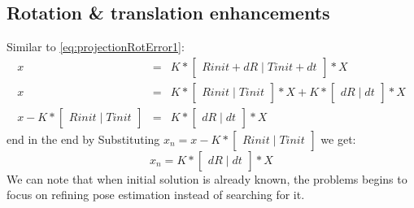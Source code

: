 \subsection{Rotation \& translation enhancements}
Similar to \ref{eq:projectionRotError1}:
\begin{equation} \label{eq:projectionRotError3}
\begin{array}{rcl}
 x & = & K * \begin{bmatrix}Rinit + dR\mid Tinit + dt\end{bmatrix} * X \\
 x & = & K * \begin{bmatrix}Rinit\mid Tinit\end{bmatrix} * X + K * \begin{bmatrix}dR\mid dt\end{bmatrix} * X \\
 x - K * \begin{bmatrix}Rinit\mid Tinit\end{bmatrix} & = & K * \begin{bmatrix}dR\mid dt\end{bmatrix} * X
\end{array}
\end{equation}
end in the end by Substituting $x_{n} = x - K * \begin{bmatrix}Rinit\mid Tinit\end{bmatrix}$ we get: 
\begin{equation} \label{eq:projectionRotError4}
x_{n} = K * \begin{bmatrix}dR\mid dt\end{bmatrix} * X
\end{equation}
We can note that when initial solution is already known, the problems begins to focus on refining pose estimation instead of searching for it.
 
 



